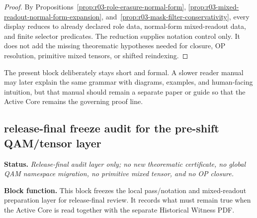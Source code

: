 \begin{proof}
By Propositions~\ref{prop:r03-role-erasure-normal-form}, \ref{prop:r03-mixed-readout-normal-form-expansion}, and~\ref{prop:r03-mask-filter-conservativity}, every display reduces to already declared role data, normal-form mixed-readout data, and finite selector predicates. The reduction supplies notation control only. It does not add the missing theorematic hypotheses needed for closure, OP resolution, primitive mixed tensors, or shifted reindexing.
\end{proof}

\begin{remark}\label{rem:r03-reader-manual-placement}
The present block deliberately stays short and formal. A slower reader manual may later explain the same grammar with diagrams, examples, and human-facing intuition, but that manual should remain a separate paper or guide so that the Active Core remains the governing proof line.
\end{remark}



\subsection*{release-final freeze audit for the pre-shift QAM/tensor layer}
\label{subsec:r04-release-final-freeze-audit-qam-tensor}

\noindent\textbf{Status.} \emph{Release-final audit layer only; no new theorematic certificate, no global QAM namespace migration, no primitive mixed tensor, and no OP closure.}\par
\noindent\textbf{Block function.} This block freezes the local pass/notation and mixed-readout preparation layer for release-final review. It records what must remain true when the Active Core is read together with the separate Historical Witness PDF.

